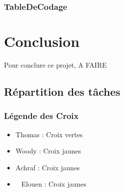 \documentclass{article}
\begin{document}
\subsubsection{\textbf{TableDeCodage}}




\newpage


\section{Conclusion}


Pour conclure ce projet,  A FAIRE

\subsection{Répartition des tâches}

\subsubsection{Légende des Croix}

\begin{itemize}
  \item \textcolor{blue}{} Thomas : Croix vertes 
  \item \textcolor{yellow}{} Woody : Croix jaunes
  \item \textcolor{red}{} Achraf : Croix jaunes
  \item \ \textcolor{green}{} Elouen : Croix jaunes
\end{itemize}
\end{document}
